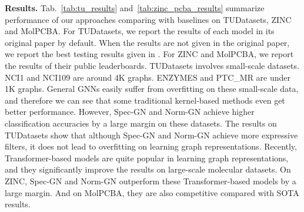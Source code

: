 \documentclass[nohyperref]{article}
\theoremstyle{plain}
\theoremstyle{definition}
\theoremstyle{remark}
\begin{document}
\begin{table}[h]
	\centering
	\caption{Results on ZINC (Lower is better) and MolPCBA (Higher is better).}
	\label{tab:zinc_pcba_results}
	\vspace{5pt}
	\vspace{-10pt}
\end{table}

\textbf{Results.}
Tab.~\ref{tab:tu_results} and~\ref{tab:zinc_pcba_results} summarize performance of our approaches comparing with baselines on TUDatasets, ZINC and MolPCBA.
For TUDatasets, we report the results of each model in its original paper by default. When the results are not given in the original paper, we report the best testing results given in \cite{zhang2018end,pmlr-v80-ivanov18a,xinyi2018capsule}.
For ZINC and MolPCBA, we report the results of their public leaderboards.
TUDatasets involves small-scale datasets.
NCI1 and NCI109 are around 4K graphs.
ENZYMES and PTC\_MR are under 1K graphs.
General GNNs easily suffer from overfitting on these small-scale data, and therefore we can see that some traditional kernel-based methods even get better performance.
However, Spec-GN and Norm-GN achieve higher classification accuracies by a large margin on these datasets.
The results on TUDatasets show that although Spec-GN and Norm-GN achieve more expressive filters, it does not lead to overfitting on learning graph representations.
Recently, Transformer-based models are quite popular in learning graph representations, and they significantly improve the results on large-scale molecular datasets.
On ZINC, Spec-GN and Norm-GN outperform these Transformer-based models by a large margin.
And on MolPCBA, they are also competitive compared with SOTA results.
\end{document}
